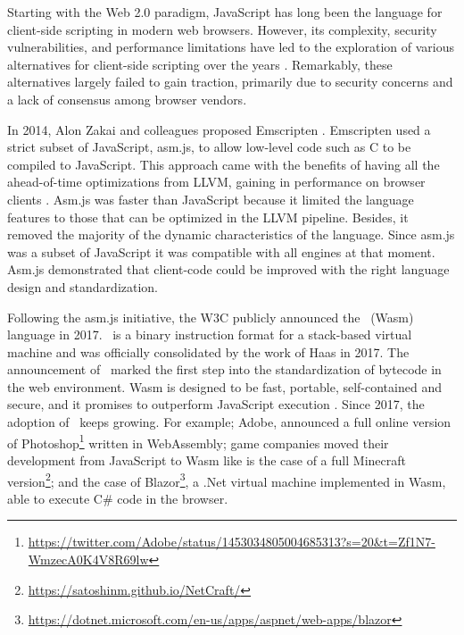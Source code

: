 
\msection{\Wasm}

Starting with the Web 2.0 paradigm, JavaScript has long been the language for client-side scripting in modern web browsers. 
However, its complexity, security vulnerabilities, and performance limitations have led to the exploration of various alternatives for client-side scripting over the years \cite{javaapplet,activex,silverlight}. 
Remarkably, these alternatives largely failed to gain traction, primarily due to security concerns and a lack of consensus among browser vendors.

In 2014, Alon Zakai and colleagues proposed Emscripten \cite{emscripten}. 
Emscripten used a strict subset of JavaScript, asm.js, to allow low-level code such as C to be compiled to JavaScript. 
This approach came with the benefits of having all the ahead-of-time optimizations from LLVM, gaining in performance on browser clients \cite{asmjs}.
Asm.js was faster than JavaScript because it limited the language features to those that can be optimized in the LLVM pipeline. 
Besides, it removed the majority of the dynamic characteristics of the language.
Since asm.js was a subset of JavaScript it was compatible with all engines at that moment. 
Asm.js demonstrated that client-code could be improved with the right language design and standardization.

Following the asm.js initiative, the W3C publicly announced the \Wasm\ (Wasm) language in 2017. \wasm\ is a binary instruction format for a stack-based virtual machine and was officially consolidated by the work of Haas \etal \cite{Haas_2017} in 2017. 
The announcement of \wasm\ marked the first step into the standardization of bytecode in the web environment. 
Wasm is designed to be fast, portable, self-contained and secure, and it promises to outperform JavaScript execution \cite{Haas_2017}. 
Since 2017, the adoption of \wasm\ keeps growing. For example; Adobe, announced a full online version of Photoshop\footnote{\url{https://twitter.com/Adobe/status/1453034805004685313?s=20&t=Zf1N7-WmzecA0K4V8R69lw}} written in WebAssembly;  game companies moved their development from JavaScript to Wasm like is the case of a full Minecraft version\footnote{\url{https://satoshinm.github.io/NetCraft/}}; and the case of Blazor\footnote{\url{https://dotnet.microsoft.com/en-us/apps/aspnet/web-apps/blazor}}, a .Net virtual machine implemented in Wasm, able to execute C\# code in the browser.


